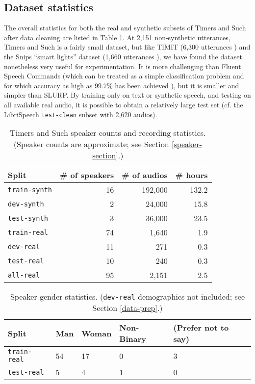 \documentclass{article}
\begin{document}
\subsection{Dataset statistics}\label{statistics}
The overall statistics for both the real and synthetic subsets of Timers and Such after data cleaning are listed in Table \ref{stats-counts}. At 2,151 non-synthetic utterances, Timers and Such is a fairly small dataset, but like TIMIT (6,300 utterances \cite{timit}) and the Snips ``smart lights'' dataset (1,660 utterances \cite{saade2018spoken}), we have found the dataset nonetheless very useful for experimentation. It is more challenging than Fluent Speech Commands (which can be treated as a simple classification problem and for which accuracy as high as 99.7\% has been achieved \cite{seo2021integration}), but it is smaller and simpler than SLURP. By training only on text or synthetic speech, and testing on all available real audio, it is possible to obtain a relatively large test set (cf. the LibriSpeech \texttt{test-clean} subset with 2,620 audios).

\begin{table}[ht]
  \caption{Timers and Such speaker counts and recording statistics. (Speaker counts are approximate; see Section \ref{speaker-section}.)}
  \centering
  \begin{tabular}{l r r r}
    \toprule
    Split & \# of speakers & \# of audios & \# hours\\
    \midrule
    \texttt{train-synth} & 16 &  192,000  & 132.2  \\
    \texttt{dev-synth}  & 2 &   24,000  &  15.8  \\
    \texttt{test-synth}  & 3 & 36,000   &  23.5 \\
    \midrule
    \texttt{train-real} & 74 &  1,640  & 1.9  \\
    \texttt{dev-real}  & 11 &   271  &  0.3  \\
    \texttt{test-real}  & 10 & 240   &  0.3 \\
    \midrule
    \texttt{all-real} & 95 & 2,151   &  2.5 \\
    \bottomrule
  \end{tabular}\label{stats-counts}
  
\end{table}

\begin{table}[ht]
  \caption{Speaker gender statistics. (\texttt{dev-real} demographics not included; see Section \ref{data-prep}.)}
  \label{tab:stats}
  \centering
  \begin{tabular}{p{20mm}p{10mm}p{10mm}p{10mm}p{15mm}}
    \toprule
    Split & Man & Woman & Non-Binary &
        (Prefer not to say)\\
    \midrule
    \texttt{train-real} & 54 &  17  & 0 & 3 \\
    \texttt{test-real}  & 5 & 4   &  1 & 0 \\
    \bottomrule
  \end{tabular}\label{stats-gender}
  
\end{table}
\end{document}
